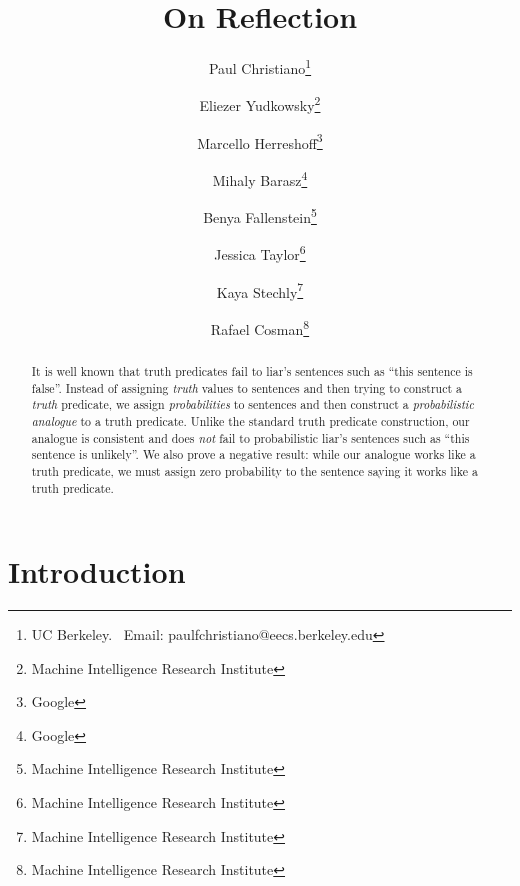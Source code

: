 \documentclass[12pt]{article}
\theoremstyle{plain}
\theoremstyle{definition}
\theoremstyle{remark}
\begin{document}
\title{On Reflection \\ }
\author{
Paul Christiano\thanks{UC Berkeley. \ Email: paulfchristiano@eecs.berkeley.edu}
\and
Eliezer Yudkowsky\thanks{Machine Intelligence Research Institute}
\and
Marcello Herreshoff\thanks{Google}
\and
Mihaly Barasz\thanks{Google}
\and 
Benya Fallenstein\thanks{Machine Intelligence Research Institute}
\and
Jessica Taylor\thanks{Machine Intelligence Research Institute}
\and 
Kaya Stechly\thanks{Machine Intelligence Research Institute}
\and
Rafael Cosman\thanks{Machine Intelligence Research Institute}
}
\maketitle
\begin{abstract}
It is well known that truth predicates fail to liar's sentences such as ``this sentence is false''.
Instead of assigning \emph{truth} values to sentences and then trying to construct a \emph{truth} predicate, we assign \emph{probabilities} to sentences and then construct a \emph{probabilistic analogue} to a truth predicate. 
Unlike the standard truth predicate construction, our analogue is consistent and does \emph{not} fail to probabilistic liar's sentences such as ``this sentence is unlikely''. 
We also prove a negative result: while our analogue works like a truth predicate, we must assign zero probability to the sentence saying it works like a truth predicate.
\end{abstract}
\setcounter{section}{-1}
\section{Introduction}




\end{document}
